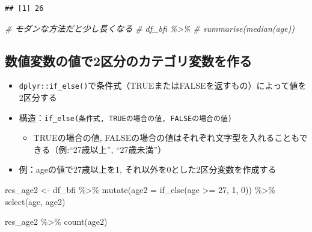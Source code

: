 \documentclass[
  xelatex,ja=standard, b5paper]{bxjsbook}
\newenvironment{Shaded}{\begin{snugshade}}{\end{snugshade}}
\newcommand{\AttributeTok}[1]{\textcolor[rgb]{0.77,0.63,0.00}{#1}}
\newcommand{\CommentTok}[1]{\textcolor[rgb]{0.56,0.35,0.01}{\textit{#1}}}
\newcommand{\DecValTok}[1]{\textcolor[rgb]{0.00,0.00,0.81}{#1}}
\newcommand{\FunctionTok}[1]{\textcolor[rgb]{0.00,0.00,0.00}{#1}}
\newcommand{\NormalTok}[1]{#1}
\newcommand{\OtherTok}[1]{\textcolor[rgb]{0.56,0.35,0.01}{#1}}
\newcommand{\SpecialCharTok}[1]{\textcolor[rgb]{0.00,0.00,0.00}{#1}}
\providecommand{\tightlist}{%
  \setlength{\itemsep}{0pt}\setlength{\parskip}{0pt}}
\begin{document}
\begin{Shaded}
\end{Shaded}

\begin{verbatim}
## [1] 26
\end{verbatim}

\begin{Shaded}
\begin{Highlighting}[]
\CommentTok{\# モダンな方法だと少し長くなる}
\CommentTok{\# df\_bfi \%\textgreater{}\% }
\CommentTok{\#   summarise(median(age))}
\end{Highlighting}
\end{Shaded}

\hypertarget{ux6570ux5024ux5909ux6570ux306eux5024ux30672ux533aux5206ux306eux30abux30c6ux30b4ux30eaux5909ux6570ux3092ux4f5cux308b}{%
\subsection{数値変数の値で2区分のカテゴリ変数を作る}\label{ux6570ux5024ux5909ux6570ux306eux5024ux30672ux533aux5206ux306eux30abux30c6ux30b4ux30eaux5909ux6570ux3092ux4f5cux308b}}

\begin{itemize}
\tightlist
\item
  \texttt{dplyr::if\_else()}で条件式（TRUEまたはFALSEを返すもの）によって値を2区分する
\item
  構造：\texttt{if\_else(条件式,\ TRUEの場合の値,\ FALSEの場合の値)}

  \begin{itemize}
  \tightlist
  \item
    TRUEの場合の値, FALSEの場合の値はそれぞれ文字型を入れることもできる（例:``27歳以上'', ``27歳未満''）
  \end{itemize}
\item
  例：ageの値で27歳以上を1, それ以外を0とした2区分変数を作成する
\end{itemize}

\begin{Shaded}
\begin{Highlighting}[]
\NormalTok{res\_age2 }\OtherTok{\textless{}{-}} 
\NormalTok{  df\_bfi }\SpecialCharTok{\%\textgreater{}\%} 
  \FunctionTok{mutate}\NormalTok{(}\AttributeTok{age2 =} \FunctionTok{if\_else}\NormalTok{(age }\SpecialCharTok{\textgreater{}=} \DecValTok{27}\NormalTok{, }\DecValTok{1}\NormalTok{, }\DecValTok{0}\NormalTok{)) }\SpecialCharTok{\%\textgreater{}\%} 
  \FunctionTok{select}\NormalTok{(age, age2)}

\NormalTok{res\_age2 }\SpecialCharTok{\%\textgreater{}\%} \FunctionTok{count}\NormalTok{(age2) }
\end{Highlighting}
\end{Shaded}
\end{document}
